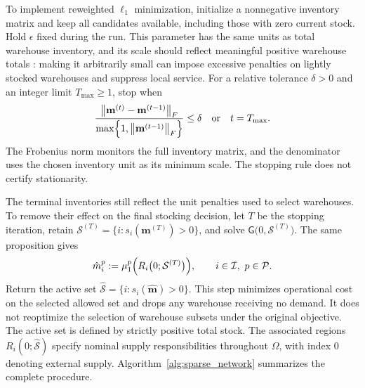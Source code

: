 \documentclass[a4paper,fleqn]{cas-sc}
\theoremstyle{remark}
\theoremstyle{plain}
\begin{document}
To implement reweighted $\ell_1$ minimization, initialize a nonnegative inventory matrix and keep all candidates available, including those with zero current stock. Hold $\epsilon$ fixed during the run. This parameter has the same units as total warehouse inventory, and its scale should reflect meaningful positive warehouse totals \citep[Section~2.3]{candes2008enhancing}: making it arbitrarily small can impose excessive penalties on lightly stocked warehouses and suppress local service. For a relative tolerance $\delta>0$ and an integer limit $T_{\max}\ge1$, stop when
\begin{equation}
    \frac{\bigl\lVert\mathbf m^{(t)}-\mathbf m^{(t-1)}\bigr\rVert_F}{\max\Bigl\{1,\bigl\lVert\mathbf m^{(t-1)}\bigr\rVert_F\Bigr\}}
        \le\delta\quad\text{or}\quad t=T_{\max}.
    \label{eq:design_stopping}
\end{equation}
The Frobenius norm monitors the full inventory matrix, and the denominator uses the chosen inventory unit as its minimum scale. The stopping rule does not certify stationarity.

The terminal inventories still reflect the unit penalties used to select warehouses. To remove their effect on the final stocking decision, let $T$ be the stopping iteration, retain $\mathcal S^{(T)}=\bigl\{i:s_i(\mathbf m^{(T)})>0\bigr\}$, and solve $\mathsf G\bigl(0,\mathcal S^{(T)}\bigr)$. The same proposition gives
\begin{equation}
    \hat m_i^p:=\mu_1^p\Bigl(R_i\bigl(0;\mathcal S^{(T)}\bigr)\Bigr),\qquad i\in\mathcal I,\ p\in\mathcal P.
    \label{eq:design_recovery}
\end{equation}
Return the active set $\widehat{\mathcal S}=\bigl\{i:s_i(\hat{\mathbf m})>0\bigr\}$. This step minimizes operational cost on the selected allowed set and drops any warehouse receiving no demand. It does not reoptimize the selection of warehouse subsets under the original objective. The active set is defined by strictly positive total stock. The associated regions $R_i(0;\widehat{\mathcal S})$ specify nominal supply responsibilities throughout $\Omega$, with index $0$ denoting external supply. Algorithm~\ref{alg:sparse_network} summarizes the complete procedure.
\end{document}
